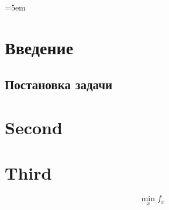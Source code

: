 \documentclass[russian]{spbseu}
\date{\the\year}
\begin{document}

\maketitle

\newpage

\setcounter{page}{2}
\begin{spacing}{1}
    \emergencystretch=5em
    \tableofcontents
\end{spacing}

\newpage

\section{Введение}
\subsection{Постановка задачи}

\indent \lipsum[1-2]

\section{Second}

\lipsum[1]

\section{Third}

\begin{equation}
    \min_xf_x
\end{equation}
\end{document}
